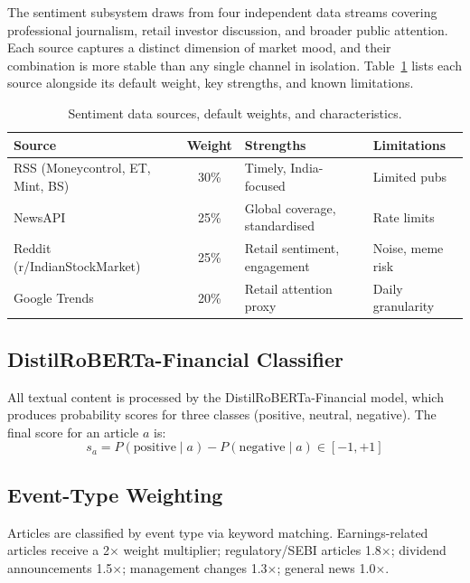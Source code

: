 \documentclass[10pt,a4paper,twoside]{article}
\begin{document}
The sentiment subsystem draws from four independent data streams covering
professional journalism, retail investor discussion, and broader public
attention. Each source captures a distinct dimension of market mood, and
their combination is more stable than any single channel in isolation.
Table~\ref{tab:sentiment} lists each source alongside its default weight,
key strengths, and known limitations.

\begin{table}[htb]
  \begin{center}
    {\caption{Sentiment data sources, default weights, and characteristics.}
    \label{tab:sentiment}}
    \begin{tabular}{|l|c|l|l|}
    \hline
    \textbf{Source} & \textbf{Weight} & \textbf{Strengths} & \textbf{Limitations} \\
    \hline
    RSS (Moneycontrol, ET, Mint, BS) & 30\% & Timely, India-focused & Limited pubs \\
    NewsAPI & 25\% & Global coverage, standardised & Rate limits \\
    Reddit (r/IndianStockMarket) & 25\% & Retail sentiment, engagement & Noise, meme risk \\
    Google Trends & 20\% & Retail attention proxy & Daily granularity \\
    \hline
    \end{tabular}
  \end{center}
\end{table}

\subsection{DistilRoBERTa-Financial Classifier}

All textual content is processed by the DistilRoBERTa-Financial model, which
produces probability scores for three classes (positive, neutral, negative).
The final score for an article $a$ is:
\begin{equation}
  s_a = P(\text{positive} \mid a) - P(\text{negative} \mid a) \in [-1, +1]
\end{equation}

\subsection{Event-Type Weighting}

Articles are classified by event type via keyword matching. Earnings-related
articles receive a 2$\times$ weight multiplier; regulatory/SEBI articles 1.8$\times$;
dividend announcements 1.5$\times$; management changes 1.3$\times$; general
news 1.0$\times$.
\end{document}
